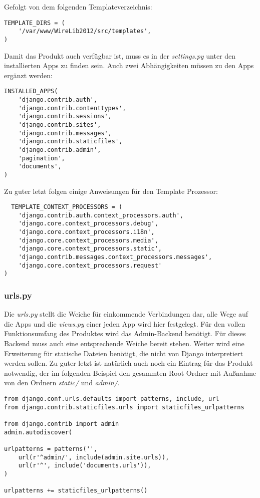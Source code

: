 Gefolgt von dem folgenden Templateverzeichnis:
\begin{lstlisting}
TEMPLATE_DIRS = (
    '/var/www/WireLib2012/src/templates',
)
\end{lstlisting}

Damit das Produkt auch verfügbar ist, muss es in der \emph{settings.py} unter
den installierten Apps zu finden sein. Auch zwei Abhängigkeiten müssen zu den
Apps ergänzt werden:
\begin{lstlisting}
INSTALLED_APPS(
    'django.contrib.auth',
    'django.contrib.contenttypes',
    'django.contrib.sessions',
    'django.contrib.sites',
    'django.contrib.messages',
    'django.contrib.staticfiles',
    'django.contrib.admin',
    'pagination',
    'documents',
)
\end{lstlisting}

Zu guter letzt folgen einige Anweisungen für den Template Prozessor:
\begin{lstlisting}
  TEMPLATE_CONTEXT_PROCESSORS = (
    'django.contrib.auth.context_processors.auth',
    'django.core.context_processors.debug',
    'django.core.context_processors.i18n',
    'django.core.context_processors.media',
    'django.core.context_processors.static',
    'django.contrib.messages.context_processors.messages',
    'django.core.context_processors.request'
)
\end{lstlisting}

\subsubsection{urls.py}
Die \emph{urls.py} stellt die Weiche für einkommende Verbindungen dar, alle
Wege auf die Apps und die \emph{views.py} einer jeden App  wird hier
festgelegt.  Für den vollen Funktionsumfang des Produktes wird das
Admin-Backend benötigt. Für dieses Backend muss auch eine entsprechende Weiche
bereit stehen. Weiter wird eine Erweiterung für statische Dateien benötigt, die
nicht von Django interpretiert werden sollen. Zu guter letzt ist natürlich auch
noch ein Eintrag für das Produkt notwendig, der im folgenden Beispiel den
gesammten Root-Ordner mit Außnahme von den Ordnern \emph{static/} und
\emph{admin/}.

\begin{lstlisting}
from django.conf.urls.defaults import patterns, include, url
from django.contrib.staticfiles.urls import staticfiles_urlpatterns

from django.contrib import admin
admin.autodiscover(

urlpatterns = patterns('',
    url(r'^admin/', include(admin.site.urls)),
    url(r'^', include('documents.urls')),
)

urlpatterns += staticfiles_urlpatterns()
\end{lstlisting}

